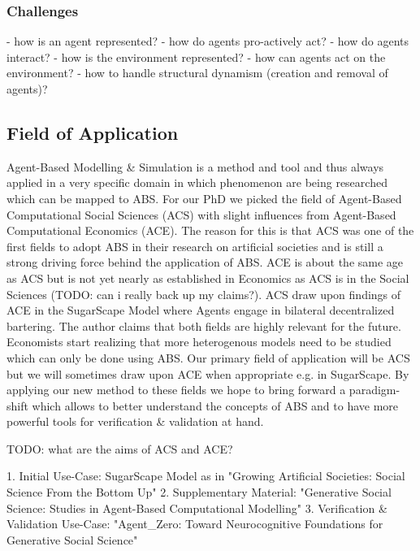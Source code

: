 \subsubsection{Challenges}
- how is an agent represented?
- how do agents pro-actively act?
- how do agents interact?
- how is the environment represented?
- how can agents act on the environment?
- how to handle structural dynamism (creation and removal of agents)?

\subsection{Field of Application}
Agent-Based Modelling \& Simulation is a method and tool and thus always applied in a very specific domain in which phenomenon are being researched which can be mapped to ABS. For our PhD we picked the field of Agent-Based Computational Social Sciences (ACS) with slight influences from Agent-Based Computational Economics (ACE). The reason for this is that ACS was one of the first fields to adopt ABS in their research on artificial societies and is still a strong driving force behind the application of ABS. ACE is about the same age as ACS but is not yet nearly as established in Economics as ACS is in the Social Sciences (TODO: can i really back up my claims?). ACS draw upon findings of ACE in the SugarScape Model where Agents engage in bilateral decentralized bartering. The author claims that both fields are highly relevant for the future. Economists start realizing that more heterogenous models need to be studied which can only be done using ABS.
Our primary field of application will be ACS but we will sometimes draw upon ACE when appropriate e.g. in SugarScape. By applying our new method to these fields we hope to bring forward a paradigm-shift which allows to better understand the concepts of ABS and to have more powerful tools for verification \& validation at hand.

TODO: what are the aims of ACS and ACE?

1. Initial Use-Case: SugarScape Model as in "Growing Artificial Societies: Social Science From the Bottom Up"
2. Supplementary Material: "Generative Social Science: Studies in Agent-Based Computational Modelling"
3. Verification \& Validation Use-Case: "Agent\_Zero: Toward Neurocognitive Foundations for Generative Social Science"